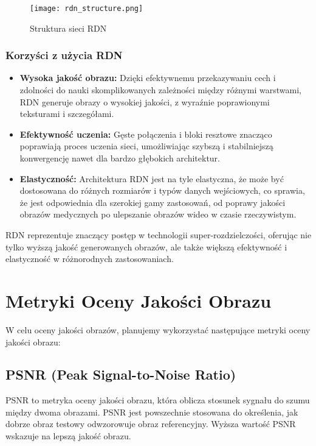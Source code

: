 \documentclass[10pt]{article}
\begin{document}
\begin{figure}[h!]
    \centering
    \texttt{[image: rdn\_structure.png]}
    \caption{Struktura sieci RDN}
    \label{fig:rdn_structure}
\end{figure}

\subsubsection*{Korzyści z użycia RDN}

\begin{itemize}
    \item \textbf{Wysoka jakość obrazu:} Dzięki efektywnemu przekazywaniu cech i zdolności do nauki skomplikowanych zależności między różnymi warstwami, RDN generuje obrazy o wysokiej jakości, z wyraźnie poprawionymi teksturami i szczegółami.
    \item \textbf{Efektywność uczenia:} Gęste połączenia i bloki resztowe znacząco poprawiają proces uczenia sieci, umożliwiając szybszą i stabilniejszą konwergencję nawet dla bardzo głębokich architektur.
    \item \textbf{Elastyczność:} Architektura RDN jest na tyle elastyczna, że może być dostosowana do różnych rozmiarów i typów danych wejściowych, co sprawia, że jest odpowiednia dla szerokiej gamy zastosowań, od poprawy jakości obrazów medycznych po ulepszanie obrazów wideo w czasie rzeczywistym.
\end{itemize}

RDN reprezentuje znaczący postęp w technologii super-rozdzielczości, oferując nie tylko wyższą jakość generowanych obrazów, ale także większą efektywność i elastyczność w różnorodnych zastosowaniach.
\newpage
\section*{Metryki Oceny Jakości Obrazu}

W celu oceny jakości obrazów, planujemy wykorzystać następujące metryki oceny jakości obrazu:

\subsection*{PSNR (Peak Signal-to-Noise Ratio)}

PSNR to metryka oceny jakości obrazu, która oblicza stosunek sygnału do szumu między dwoma obrazami. PSNR jest powszechnie stosowana do określenia, jak dobrze obraz testowy odwzorowuje obraz referencyjny. Wyższa wartość PSNR wskazuje na lepszą jakość obrazu.
\end{document}
